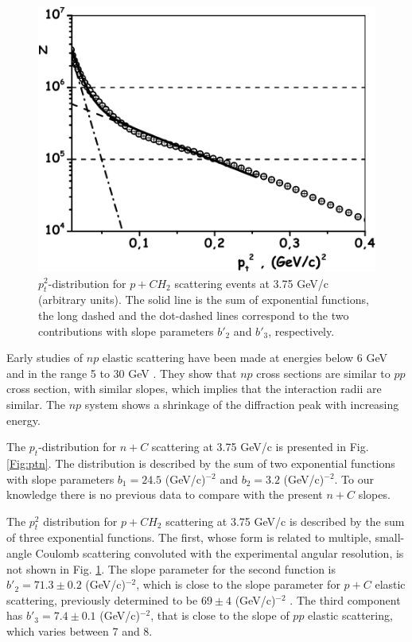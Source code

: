 \documentclass[twocolumn,epjc3]{svjour3}
\begin{document}
\begin{figure}
  \centering
  \includegraphics[width=1.00\columnwidth]{fig15_pCH2_pt2.pdf}
  \caption{\small $p_t^2$-distribution for $p+CH_2$ scattering events at 3.75 GeV/c (arbitrary units). The solid line is the sum of exponential functions, the long dashed and the dot-dashed lines correspond to the two contributions with slope parameters $b'_2$ and $b'_3$, respectively.}
  \label{Fig:ptp}
\end{figure}

Early studies of $np$ elastic scattering have been made at energies below 6 GeV \cite{Kreisler-SLAC1966,Bystricky:1981} and in the range 5 to 30 GeV \cite{Gibbard:1971rt}. They show that $np$ cross sections are similar to $pp$ cross section, with similar slopes, which implies that the interaction radii are similar. The $np$ system shows a shrinkage of the diffraction peak with increasing energy.

The $p_t$-distribution for $n+C$ scattering at 3.75 GeV/c is presented in Fig. \ref{Fig:ptn}. The distribution is described by the sum of two exponential functions with slope parameters $b_1=24.5$ (GeV/c)$^{-2}$ and $b_2=3.2$ (GeV/c)$^{-2}$. To our knowledge there is no previous data to compare with the present $n+C$ slopes.

The $p_t^2$ distribution for $p+CH_2$ scattering at 3.75 GeV/c is described by the sum of three exponential functions. The first, whose form is related to multiple, small-angle Coulomb scattering convoluted with the experimental angular resolution, is not shown in Fig. \ref{Fig:ptp}. The slope parameter for the second function is $b'_2=71.3\pm 0.2 $ (GeV/c)$^{-2}$, which is close to the slope parameter for $p+C$ elastic scattering, previously determined to be $69 \pm 4$ (GeV/c)$^{-2}$ \cite{Jaros:1977it}. The third component has $b'_3=7.4\pm 0.1$ (GeV/c)$^{-2}$, that is close to the slope of $pp$ elastic scattering, which varies between 7 and 8.
\end{document}
